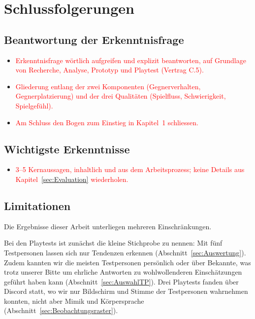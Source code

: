 \documentclass[../Main.tex]{subfiles}
\begin{document}
\section{Schlussfolgerungen} \label{sec:Schlussfolgerungen}

\subsection{Beantwortung der Erkenntnisfrage}

\begin{itemize}[leftmargin=1.5cm]
    \item \textcolor{red}{Erkenntnisfrage wörtlich aufgreifen und explizit beantworten, auf Grundlage von Recherche, Analyse, Prototyp und Playtest (Vertrag C.5).}
    \item \textcolor{red}{Gliederung entlang der zwei Komponenten (Gegnerverhalten, Gegnerplatzierung) und der drei Qualitäten (Spielfluss, Schwierigkeit, Spielgefühl).}
    \item \textcolor{red}{Am Schluss den Bogen zum Einstieg in Kapitel~1 schliessen.}
\end{itemize}

\subsection{Wichtigste Erkenntnisse}

\begin{itemize}[leftmargin=1.5cm]
    \item \textcolor{red}{3--5 Kernaussagen, inhaltlich und aus dem Arbeitsprozess; keine Details aus Kapitel~\ref{sec:Evaluation} wiederholen.}
\end{itemize}

\subsection{Limitationen} \label{sec:Limitationen}

Die Ergebnisse dieser Arbeit unterliegen mehreren Einschränkungen.

Bei den Playtests ist zunächst die kleine Stichprobe zu nennen: Mit fünf Testpersonen lassen sich nur Tendenzen erkennen (Abschnitt~\ref{sec:Auswertung}). Zudem kannten wir die meisten Testpersonen persönlich oder über Bekannte, was trotz unserer Bitte um ehrliche Antworten zu wohlwollenderen Einschätzungen geführt haben kann (Abschnitt~\ref{sec:AuswahlTP}). Drei Playtests fanden über Discord statt, wo wir nur Bildschirm und Stimme der Testpersonen wahrnehmen konnten, nicht aber Mimik und Körpersprache (Abschnitt~\ref{sec:Beobachtungsraster}).
\end{document}
